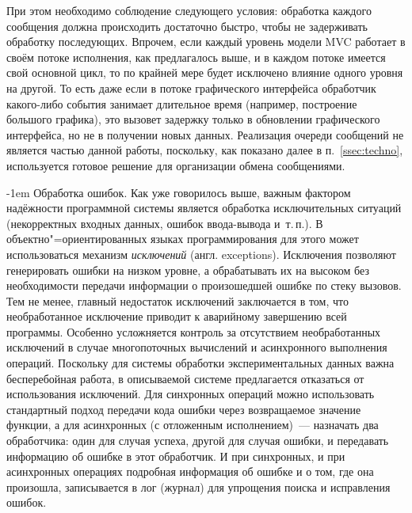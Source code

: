 \documentclass[a4paper, 14pt, titlepage]{extarticle}
\makeatletter
\newcommand{\eng}[1]{\foreignlanguage{english}{#1}}
\newcommand{\term}[1]{\emph{#1}}
\renewcommand{\paragraph}{%
    \@startsection{paragraph}{4}%
    {\parindent}{\z@}{-1em}%
    {\normalfont\normalsize\bfseries}%
  }
\makeatother
\begin{document}
  При этом необходимо соблюдение следующего условия: обработка каждого сообщения должна происходить
  достаточно быстро, чтобы не задерживать обработку
  последующих. Впрочем, если каждый уровень модели MVC работает в своём потоке исполнения, как
  предлагалось выше, и в каждом потоке имеется свой основной цикл, то по крайней мере будет
  исключено влияние одного уровня на другой. То есть даже если в потоке графического интерфейса
  обработчик какого-либо события занимает длительное время (например, построение большого графика),
  это вызовет задержку только в обновлении графического интерфейса, но не в получении новых данных.
  Реализация очереди сообщений не является частью данной работы, поскольку, как показано далее
  в п.~\ref{ssec:techno}, используется готовое решение для организации обмена сообщениями.

  \paragraph{Обработка ошибок.} Как уже говорилось выше, важным фактором надёжности программной
  системы является обработка исключительных ситуаций (некорректных входных данных, ошибок
  ввода-вывода и~т.\,п.). В объектно"=ориентированных языках программирования для этого может
  использоваться механизм \term{исключений} (англ. \eng{exceptions}).
  Исключения позволяют генерировать ошибки на низком уровне, а обрабатывать их на высоком без
  необходимости передачи информации о произошедшей ошибке по стеку вызовов.
  Тем не менее, главный недостаток исключений заключается в том, что необработанное исключение
  приводит к аварийному завершению всей программы. Особенно усложняется контроль за отсутствием
  необработанных исключений в случае многопоточных вычислений и асинхронного выполнения операций.
  Поскольку для системы обработки экспериментальных данных важна бесперебойная работа, в описываемой
  системе предлагается отказаться от использования исключений. Для синхронных операций можно
  использовать стандартный подход передачи кода ошибки через возвращаемое значение функции, а для
  асинхронных (с отложенным исполнением)~--- назначать два обработчика: один для случая успеха,
  другой для случая ошибки, и передавать информацию об ошибке в этот обработчик. И при синхронных, и
  при асинхронных операциях подробная информация об ошибке и о том, где она произошла, записывается в
  лог (журнал) для упрощения поиска и исправления ошибок.


\end{document}
